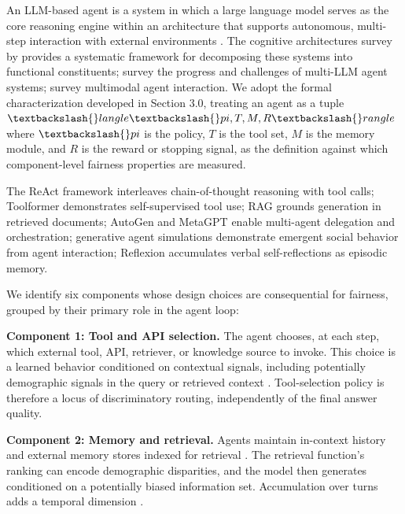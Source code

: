 \documentclass[10pt]{article}
\begin{document}
An LLM-based agent is a system in which a large language model serves as the core reasoning engine within an architecture that supports autonomous, multi-step interaction with external environments \cite{wang2024survey,xi2023rise}. The cognitive architectures survey by \cite{sumers2024cognitive} provides a systematic framework for decomposing these systems into functional constituents; \cite{guo2024large} survey the progress and challenges of multi-LLM agent systems; \cite{durante2024agent} survey multimodal agent interaction. We adopt the formal characterization developed in Section 3.0, treating an agent as a tuple $\textbackslash\{\}langle \textbackslash\{\}pi, T, M, R \textbackslash\{\}rangle$ where $\textbackslash\{\}pi$ is the policy, $T$ is the tool set, $M$ is the memory module, and $R$ is the reward or stopping signal, as the definition against which component-level fairness properties are measured.

The ReAct framework \cite{yao2023react} interleaves chain-of-thought reasoning with tool calls; Toolformer \cite{schick2023toolformer} demonstrates self-supervised tool use; RAG \cite{lewis2020retrieval} grounds generation in retrieved documents; AutoGen \cite{wu2023autogen} and MetaGPT \cite{hong2024metagpt} enable multi-agent delegation and orchestration; generative agent simulations \cite{park2023generative} demonstrate emergent social behavior from agent interaction; Reflexion \cite{shinn2023reflexion} accumulates verbal self-reflections as episodic memory.

We identify six components whose design choices are consequential for fairness, grouped by their primary role in the agent loop:

\textbf{Component 1: Tool and API selection.} The agent chooses, at each step, which external tool, API, retriever, or knowledge source to invoke. This choice is a learned behavior conditioned on contextual signals, including potentially demographic signals in the query or retrieved context \cite{blankenstein2025biasbusters}. Tool-selection policy is therefore a locus of discriminatory routing, independently of the final answer quality.

\textbf{Component 2: Memory and retrieval.} Agents maintain in-context history and external memory stores indexed for retrieval \cite{lewis2020retrieval}. The retrieval function's ranking can encode demographic disparities, and the model then generates conditioned on a potentially biased information set. Accumulation over turns adds a temporal dimension \cite{fan2024fairmt}.
\end{document}
